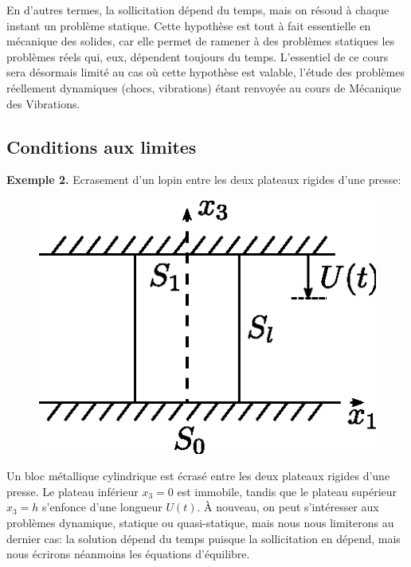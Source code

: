 \begin{enumerate}
        En d'autres termes, la sollicitation dépend du temps, mais on résoud à chaque instant un problème statique.
        Cette hypothèse est tout à fait essentielle en mécanique des solides, car elle permet de ramener à des problèmes statiques les problèmes réels qui, eux, dépendent toujours du temps.
        L'essentiel de ce cours sera désormais limité au cas où cette hypothèse est valable, l'étude des problèmes réellement dynamiques (chocs, vibrations) étant renvoyée au cours de Mécanique des Vibrations.
\end{enumerate}
\subsection{Conditions aux limites} \label{ssec:Ch04-1.2}
\textbf{Exemple 2.} Ecrasement d'un lopin entre les deux plateaux rigides d'une presse:
\begin{figure}
    \begin{center}
        \includegraphics{../images/T1_Ch04-0002}
    \end{center}
\end{figure}
Un bloc métallique cylindrique est écrasé entre les deux plateaux rigides d'une presse.
Le plateau inférieur $x_3 =0$ est immobile, tandis que le plateau supérieur $x_3 =h$ s'enfonce d'une longueur $U(t)$.
À nouveau, on peut s'intéresser aux problèmes dynamique, statique ou quasi-statique, mais nous nous limiterons au dernier cas: la solution dépend du temps puisque la sollicitation en dépend, mais nous écrirons néanmoins les équations d'équilibre.

